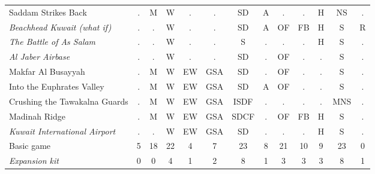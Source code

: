 \documentclass[a4paper]{article}
\newenvironment{texte}{\rmfamily\footnotesize}{}
\begin{document}
\begin{texte}
\begin{tabular}{lcccccccccccc}
     Saddam Strikes Back                           & . &  M &  W &  . &  .  & SD    & A &  . &  . & H & NS  & . \\
\it  Beachhead Kuwait (what if)                    & . &  . &  W &  . &  .  & SD    & A & OF & FB & H &  S  & R \\
\it  The Battle of As Salam                        & . &  . &  W &  . &  .  & S     & . &  . &  . & H &  S  & . \\
\it  Al Jaber Airbase                              & . &  . &  W &  . &  .  & SD    & . & OF &  . & . &  S  & . \\
     Makfar Al Busayyah                            & . &  M &  W & EW & GSA & SD    & . & OF &  . & . &  S  & . \\
     Into the Euphrates Valley                     & . &  M &  W & EW & GSA & SD    & A & OF &  . & . &  S  & . \\
     Crushing the Tawakalna Guards                 & . &  M &  W & EW & GSA & ISDF  & . &  . &  . & . & MNS & . \\
     Madinah Ridge                                 & . &  M &  W & EW & GSA & SDCF  & . & OF & FB & H &  S  & . \\
\it  Kuwait International Airport                  & . &  . &  W & EW & GSA & SD    & . &  . &  . & H &  S  & . \\
\hline
    Basic game                                     & 5 & 18 & 22 &  4 &  7  & 23    & 8 & 21 & 10 & 9 & 23  & 0 \\
\it Expansion kit                                  & 0 &  0 &  4 &  1 &  2  &  8    & 1 &  3 &  3 & 3 &  8  & 1 \\
\end{tabular}

\end{texte}
\end{document}
